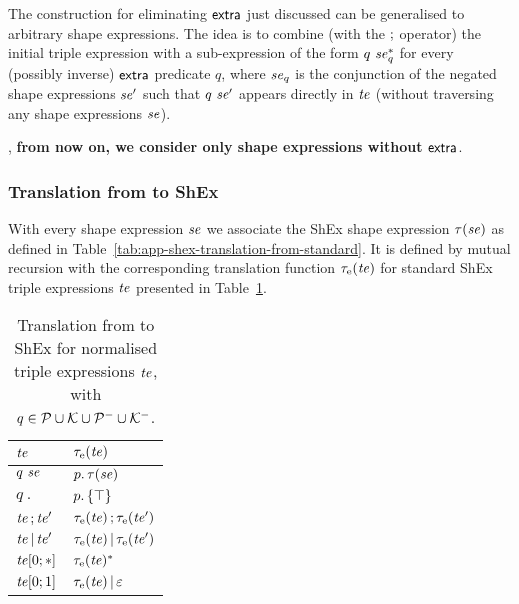 The construction for eliminating $\mathsf{extra}$ just discussed can be generalised
to arbitrary shape expressions.
The idea is to combine (with the $\mathop{;}$ operator) the initial triple
expression with a sub-expression of the form $q\ \mathit{se}_q^{*}$ for every
(possibly inverse) $\mathsf{extra}$ predicate $q$, where $\mathit{se}_q$ is the conjunction
of the negated shape expressions $\mathit{se}'$ such that $q\ \mathit{se}'$ appears directly
in $\mathit{te}$ (without traversing any shape expressions $\mathit{se}$).

\Wlogx, \textbf{from now on, we consider only \stshex shape expressions without
$\mathsf{extra}$}.


\subsubsection{Translation from \stshex to ShEx}

With every \stshex shape expression $\mathit{se}$ we associate the ShEx shape
expression $\tau(\mathit{se})$ as defined in
Table~\ref{tab:app-shex-translation-from-standard}.
It is defined by mutual recursion with the corresponding translation function
$\tau_{\text{e}}(\mathit{te})$ for standard ShEx triple expressions $\mathit{te}$ presented in
Table~\ref{tab:app-shex-translation-from-standard-te}.


\begin{table}[ht]
\caption{\label{tab:app-shex-translation-from-standard-te}%
  Translation from \stshex to ShEx for normalised triple expressions $\mathit{te}$,
  with $q \in \mathcal{P} \cup \mathcal{K} \cup \mathcal{P}^{-} \cup \mathcal{K}^{-}$.}
\centering
\begin{tabular}{ll}
\toprule
  $\mathit{te}$                   & $\tau_{\text{e}}(\mathit{te})$ \\
\midrule
  $q\ \stse$                & $p. \,\tau(\mathit{se})$ \\
  $q\ .$                    & $p.\left\{ \top \right\}$ \\
  $\mathit{te} \mathop{;} \mathit{te}'$  & $\tau_{\text{e}}(\mathit{te}) \mathop{;}
                              \tau_{\text{e}}(\mathit{te}')$ \\
  $\mathit{te} \mathop{|} \mathit{te}'$   & $\tau_{\text{e}}(\mathit{te}) \mathop{|}
                              \tau_{\text{e}}(\mathit{te}')$ \\
  $\mathit{te}[0;*]$              & $\tau_{\text{e}}(\mathit{te})^{*}$ \\
  $\mathit{te}[0;1]$              & $\tau_{\text{e}}(\mathit{te}) \mathop{|} \varepsilon$ \\
\bottomrule
\end{tabular}
\end{table}

